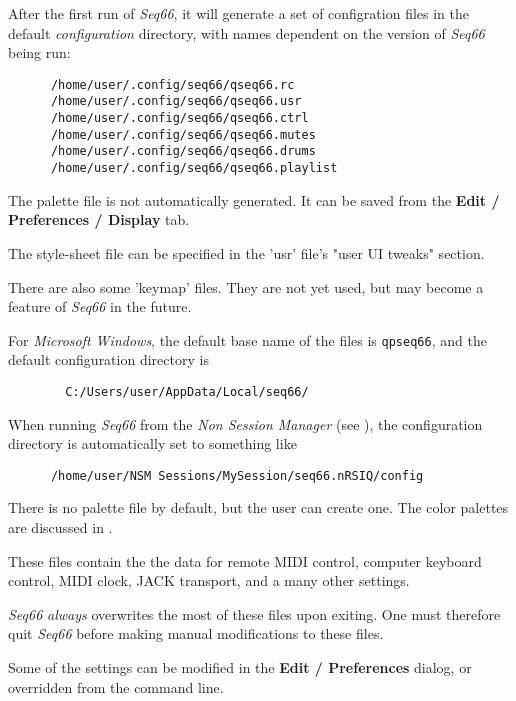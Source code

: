    After the first run of \textsl{Seq66},
   it will generate a set of configration files in the default
   \textsl{configuration} directory, with names dependent on the version of
   \textsl{Seq66} being run:

   \begin{verbatim}
      /home/user/.config/seq66/qseq66.rc
      /home/user/.config/seq66/qseq66.usr
      /home/user/.config/seq66/qseq66.ctrl
      /home/user/.config/seq66/qseq66.mutes
      /home/user/.config/seq66/qseq66.drums
      /home/user/.config/seq66/qseq66.playlist
   \end{verbatim}

   The palette file is not automatically generated.  It can be saved from the
   \textbf{Edit / Preferences / Display} tab.

   The style-sheet file can be specified in the 'usr' file's "user UI tweaks"
   section.

   There are also some 'keymap' files.  They are not yet used, but may become a
   feature of \textsl{Seq66} in the future.

   For \textsl{Microsoft Windows}, the default base name of the files is
   \texttt{qpseq66}, and the default configuration directory is

   \begin{verbatim}
        C:/Users/user/AppData/Local/seq66/
   \end{verbatim}

   When running \textsl{Seq66} from the \textsl{Non Session Manager}
   (see ),
   the configuration directory is automatically set to something like

   \begin{verbatim}
      /home/user/NSM Sessions/MySession/seq66.nRSIQ/config
   \end{verbatim}

   There is no palette file by default, but the user can create one.
   The color palettes are discussed in .

   These files contain the the data for remote MIDI control, computer keyboard
   control, MIDI clock, JACK transport, and a many other settings.

   \textsl{Seq66} \textsl{always} overwrites the most of these files upon
   exiting.  One must therefore quit \textsl{Seq66} before making
   manual modifications to these files.

   Some of the settings can be modified in the \textbf{Edit / Preferences}
   dialog, or overridden from the command line.

